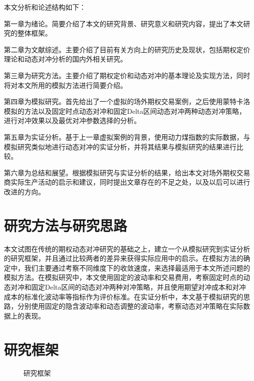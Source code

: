 本文分析和论述结构如下：

第一章为绪论。简要介绍了本文的研究背景、研究意义和研究内容，提出了本文研究的整体框架。

第二章为文献综述。主要介绍了目前有关方向上的研究历史及现状，包括期权定价理论和动态对冲分析的国内外相关研究。

第三章为研究方法。主要介绍了期权定价和动态对冲的基本理论及实现方法，同时将对本文所用的模拟方法进行简要介绍。

第四章为模拟研究。首先给出了一个虚拟的场外期权交易案例，之后使用蒙特卡洛模拟的方法以及固定时点动态对冲和固定Delta区间动态对冲两种动态对冲策略，进行对冲效果以及最优对冲参数选择的分析。

第五章为实证分析。基于上一章虚拟案例的背景，使用动力煤指数的实际数据，与模拟研究类似地进行动态对冲的实证分析，并将其结果与模拟研究的结果进行比较。

第六章为总结和展望。根据模拟研究与实证分析的结果，给出本文对场外期权交易商实际生产活动的启示和建议，同时提出文章存在的不足之处，以及以后可以进行改进的方向。

\section{研究方法与研究思路}

本文试图在传统的期权动态对冲研究的基础之上，建立一个从模拟研究到实证分析的研究框架，并且通过比较两者的差异来获得实际应用中的启示。在模拟方法的确定中，我们主要通过考察不同维度下的收敛速度，来选择最适用于本文所述问题的模拟方法。在模拟研究中，本文使用固定的波动率和交易费用，考察固定时点的动态对冲和固定Delta区间的动态对冲两种对冲策略，并且使用期望对冲成本和对冲成本的标准化波动率等指标作为评价标准。在实证分析中，本文基于模拟研究的思路，分别使用固定的隐含波动率和动态调整的波动率，考察动态对冲策略在实际数据上的表现。

\newpage
\section{研究框架}

\begin{figure}[!htp]
    \centering
    \resizebox{6cm}{!}{}
    \caption{研究框架}
    \label{fig:flow_chart}
\end{figure}
